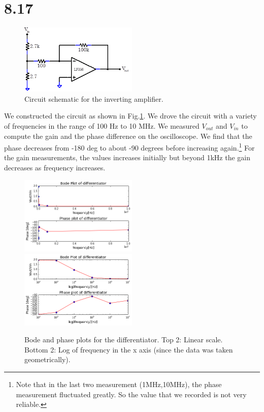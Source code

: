 \documentclass[authoryear, 12pt,5p, times]{elsarticle}
\begin{document}
 \section*{8.17}
 \begin{figure}[h!]
 \centering
  \includegraphics[width=0.5\textwidth]{figure/8_17_schema.png} 
\caption{Circuit schematic for the inverting amplifier.}
\label{8_17_schema}
 \end{figure} 
 We constructed the circuit as shown in Fig.\ref{8_17_schema}. We drove the 
circuit with a variety of frequencies in the range of 100 Hz to 10 MHz. We measured $V_{out}$ and $V_{in}$ to compute the gain and the phase difference on the oscilloscope. We find that the phase decreases from -180 deg to about -90 degrees before increasing again.\footnote{Note that in the last two measurement (1MHz,10MHz), the phase measurement fluctuated greatly. So the value that we recorded is not very reliable.} For the gain measurements, the values increases initially but beyond 1kHz the gain decreases as frequency increases.
   \begin{figure}[h!]
 \centering
  \includegraphics[width=0.5\textwidth]{figure/8_17_plot.png} 
    \includegraphics[width=0.5\textwidth]{figure/8_17_plotlog.png} 
\caption{Bode and phase plots for the differentiator. Top 2: Linear scale. Bottom 2: Log of frequency in the x axis (since the data was taken geometrically).}
\label{8_18_schema}
 \end{figure} 
\end{document}
